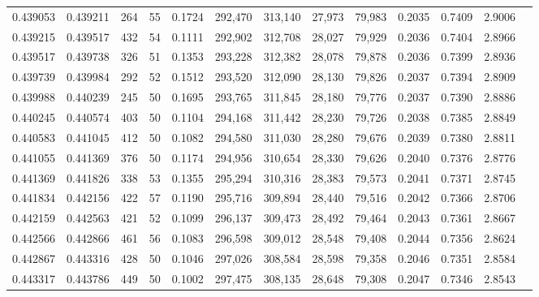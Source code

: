 \begin{tabular}{rrrrrrrrrrrrr}
0.439053 & 0.439211 &   264 &  55 &                                     0.1724 & 292,470 & 313,140 &  27,973 &  79,983 & 0.2035 & 0.7409 & 2.9006 \\
0.439215 & 0.439517 &   432 &  54 &                                     0.1111 & 292,902 & 312,708 &  28,027 &  79,929 & 0.2036 & 0.7404 & 2.8966 \\
0.439517 & 0.439738 &   326 &  51 &                                     0.1353 & 293,228 & 312,382 &  28,078 &  79,878 & 0.2036 & 0.7399 & 2.8936 \\
0.439739 & 0.439984 &   292 &  52 &                                     0.1512 & 293,520 & 312,090 &  28,130 &  79,826 & 0.2037 & 0.7394 & 2.8909 \\
0.439988 & 0.440239 &   245 &  50 &                                     0.1695 & 293,765 & 311,845 &  28,180 &  79,776 & 0.2037 & 0.7390 & 2.8886 \\
0.440245 & 0.440574 &   403 &  50 &                                     0.1104 & 294,168 & 311,442 &  28,230 &  79,726 & 0.2038 & 0.7385 & 2.8849 \\
0.440583 & 0.441045 &   412 &  50 &                                     0.1082 & 294,580 & 311,030 &  28,280 &  79,676 & 0.2039 & 0.7380 & 2.8811 \\
0.441055 & 0.441369 &   376 &  50 &                                     0.1174 & 294,956 & 310,654 &  28,330 &  79,626 & 0.2040 & 0.7376 & 2.8776 \\
0.441369 & 0.441826 &   338 &  53 &                                     0.1355 & 295,294 & 310,316 &  28,383 &  79,573 & 0.2041 & 0.7371 & 2.8745 \\
0.441834 & 0.442156 &   422 &  57 &                                     0.1190 & 295,716 & 309,894 &  28,440 &  79,516 & 0.2042 & 0.7366 & 2.8706 \\
0.442159 & 0.442563 &   421 &  52 &                                     0.1099 & 296,137 & 309,473 &  28,492 &  79,464 & 0.2043 & 0.7361 & 2.8667 \\
0.442566 & 0.442866 &   461 &  56 &                                     0.1083 & 296,598 & 309,012 &  28,548 &  79,408 & 0.2044 & 0.7356 & 2.8624 \\
0.442867 & 0.443316 &   428 &  50 &                                     0.1046 & 297,026 & 308,584 &  28,598 &  79,358 & 0.2046 & 0.7351 & 2.8584 \\
0.443317 & 0.443786 &   449 &  50 &                                     0.1002 & 297,475 & 308,135 &  28,648 &  79,308 & 0.2047 & 0.7346 & 2.8543 \\

\end{tabular}
